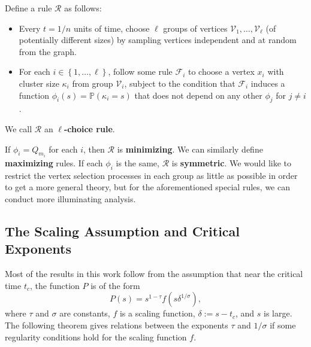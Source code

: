 \documentclass[twoside,10pt]{article}
\begin{document}
\begin{defn}[]
        Define a rule $\mathcal{R}$ as follows:
        \begin{itemize}
                \item Every $t=1/n$ units of time, choose $\ell$ groups of vertices $\mathcal{V}_1, \dots, \mathcal{V}_{\ell}$ (of potentially different sizes) by sampling vertices independent and at random from the graph.
                \item For each $i \in \left\{ 1, \dots, \ell \right\}$, follow some rule $\mathcal{F}_{i}$ to choose a vertex $x_i$ with cluster size $\kappa_i$ from group $\mathcal{V}_i$, subject to the condition that $\mathcal{F}_i$ induces a function $\phi_i(s) = \mathbb{P}\left( \kappa_i=s \right) $ that does not depend on any other $\phi_j$ for $j \neq i$.
        \end{itemize}
We call $\mathcal{R}$ an \textbf{$\ell$-choice rule}.
\end{defn}

If $\phi_{i}=Q_{m_i}$ for each $i$, then $\mathcal{R}$ is \textbf{minimizing}. We can similarly define \textbf{maximizing} rules. If each $\phi_i$ is the same, $\mathcal{R}$ is \textbf{symmetric}. We would like to restrict the vertex selection processes in each group as little as possible in order to get a more general theory, but for the aforementioned special rules, we can conduct more illuminating analysis.

\subsection{The Scaling Assumption and Critical Exponents}


Most of the results in this work follow from the assumption that near the critical time $t_c$, the function $P$ is of the form
\begin{equation}
        P(s) = s^{1-\tau}f(s \delta^{1/\sigma}),
\end{equation}
where $\tau$ and $\sigma$ are constants, $f$ is a scaling function, $\delta:= s-t_{c}$, and $s$ is large. The following theorem gives relations between the exponents $\tau$ and $1/\sigma$ if some regularity conditions hold for the scaling function $f$.
\end{document}
